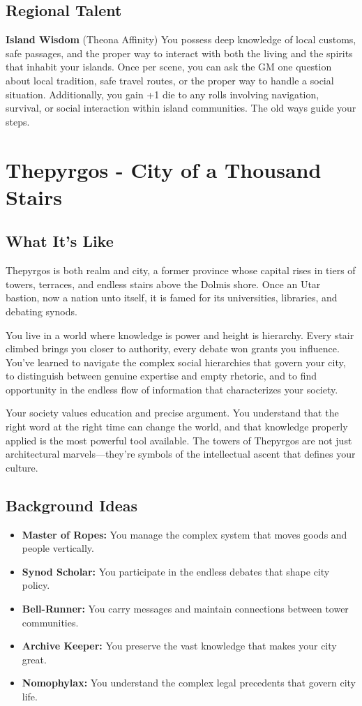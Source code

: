 \documentclass[11pt]{article}
\newcommand{\region}[1]{\section*{#1}}
\newcommand{\subregion}[1]{\subsection*{#1}}
\begin{document}
\begin{multicols}{2}
\subregion{Regional Talent}

\textbf{Island Wisdom} (Theona Affinity)
You possess deep knowledge of local customs, safe passages, and the proper way to interact with both the living and the spirits that inhabit your islands. Once per scene, you can ask the GM one question about local tradition, safe travel routes, or the proper way to handle a social situation. Additionally, you gain +1 die to any rolls involving navigation, survival, or social interaction within island communities. The old ways guide your steps.

\end{multicols}

\region{Thepyrgos - City of a Thousand Stairs}

\begin{multicols}{2}
\subregion{What It's Like}

Thepyrgos is both realm and city, a former province whose capital rises in tiers of towers, terraces, and endless stairs above the Dolmis shore. Once an Utar bastion, now a nation unto itself, it is famed for its universities, libraries, and debating synods.

You live in a world where knowledge is power and height is hierarchy. Every stair climbed brings you closer to authority, every debate won grants you influence. You've learned to navigate the complex social hierarchies that govern your city, to distinguish between genuine expertise and empty rhetoric, and to find opportunity in the endless flow of information that characterizes your society.

Your society values education and precise argument. You understand that the right word at the right time can change the world, and that knowledge properly applied is the most powerful tool available. The towers of Thepyrgos are not just architectural marvels—they're symbols of the intellectual ascent that defines your culture.

\columnbreak

\subregion{Background Ideas}

\begin{itemize}[leftmargin=*]
    \item \textbf{Master of Ropes:} You manage the complex system that moves goods and people vertically.
    \item \textbf{Synod Scholar:} You participate in the endless debates that shape city policy.
    \item \textbf{Bell-Runner:} You carry messages and maintain connections between tower communities.
    \item \textbf{Archive Keeper:} You preserve the vast knowledge that makes your city great.
    \item \textbf{Nomophylax:} You understand the complex legal precedents that govern city life.
\end{itemize}


\end{multicols}
\end{document}
